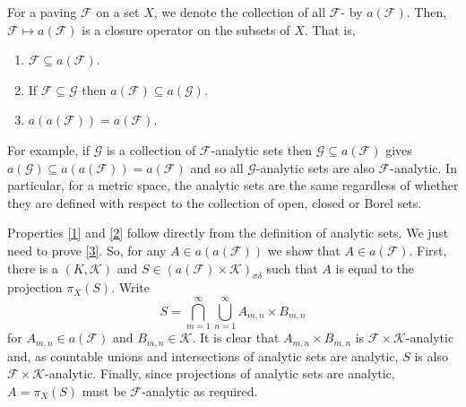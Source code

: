 \documentclass[12pt]{article}
\begin{document}

For a paving $\mathcal{F}$ on a set $X$, we denote the collection of all $\mathcal{F}$- by $a(\mathcal{F})$.
Then, $\mathcal{F}\mapsto a(\mathcal{F})$ is a closure operator on the subsets of $X$.
That is,
\begin{enumerate}
\item\label{1} $\mathcal{F}\subseteq a(\mathcal{F})$.
\item\label{2} If $\mathcal{F}\subseteq\mathcal{G}$ then $a(\mathcal{F})\subseteq a(\mathcal{G})$.
\item\label{3} $a(a(\mathcal{F}))=a(\mathcal{F})$.
\end{enumerate}

For example, if $\mathcal{G}$ is a collection of $\mathcal{F}$-analytic sets then $\mathcal{G}\subseteq a(\mathcal{F})$ gives $a(\mathcal{G})\subseteq a(a(\mathcal{F}))=a(\mathcal{F})$ and so all $\mathcal{G}$-analytic sets are also $\mathcal{F}$-analytic. In particular, for a metric space, the analytic sets are the same regardless of whether they are defined with respect to the collection of open, closed or Borel sets.

Properties \ref{1} and \ref{2} follow directly from the definition of analytic sets. We just need to prove \ref{3}. So, for any $A\in a(a(\mathcal{F}))$ we show that $A\in a(\mathcal{F})$. First, there is a  $(K,\mathcal{K})$ and $S\in \left(a(\mathcal{F})\times\mathcal{K}\right)_{\sigma\delta}$ such that $A$ is equal to the projection $\pi_X(S)$.
Write
\begin{equation*}
S=\bigcap_{m=1}^\infty\bigcup_{n=1}^\infty A_{m,n}\times B_{m,n}
\end{equation*}
for $A_{m,n}\in a(\mathcal{F})$ and $B_{m,n}\in\mathcal{K}$. It is clear that $A_{m,n}\times B_{m,n}$ is $\mathcal{F}\times\mathcal{K}$-analytic and, as countable unions and intersections of analytic sets are analytic, $S$ is also $\mathcal{F}\times\mathcal{K}$-analytic. Finally, since projections of analytic sets are analytic, $A=\pi_X(S)$ must be $\mathcal{F}$-analytic as required.

\end{document}
